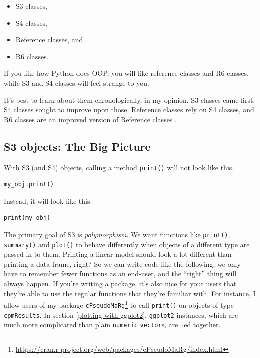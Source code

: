 \documentclass[
  12pt,
  krantz2]{krantz}
\providecommand{\tightlist}{%
  \setlength{\itemsep}{0pt}\setlength{\parskip}{0pt}}
\renewcommand{\href}[2]{#2\footnote{\url{#1}}}
\begin{document}
\begin{itemize}
\tightlist
\item
  S3 classes,
\item
  S4 classes,
\item
  Reference classes, and
\item
  R6 classes.
\end{itemize}

If you like how Python does OOP, you will like reference classes and R6 classes, while S3 and S4 classes will feel strange to you.

It's best to learn about them chronologically, in my opinion. S3 classes came first, S4 classes sought to improve upon those. Reference classes rely on S4 classes, and R6 classes are an improved version of Reference classes \citep{wickham2014advanced}.

\hypertarget{s3-objects-the-big-picture}{%
\subsection{S3 objects: The Big Picture}\label{s3-objects-the-big-picture}}

With S3 (and S4) objects, calling a method \texttt{print()} will not look like this.

\begin{verbatim}
my_obj.print()
\end{verbatim}

Instead, it will look like this:

\begin{verbatim}
print(my_obj)
\end{verbatim}

The primary goal of S3 is \emph{polymorphism}. We want functions like \texttt{print()}, \texttt{summary()} and \texttt{plot()} to behave differently when objects of a different type are passed in to them. Printing a linear model should look a lot different than printing a data frame, right? So we can write code like the following, we only have to remember fewer functions as an end-user, and the ``right'' thing will always happen. If you're writing a package, it's also nice for your users that they're able to use the regular functions that they're familiar with. For instance, I allow users of my package \href{https://cran.r-project.org/web/packages/cPseudoMaRg/index.html}{\texttt{cPseudoMaRg}} \citep{cpm} to call \texttt{print()} on objects of type \texttt{cpmResults}. In section \ref{plotting-with-ggplot2}, \texttt{ggplot2} instances, which are much more complicated than plain \texttt{numeric} \texttt{vector}s, are \texttt{+}ed together.
\end{document}
